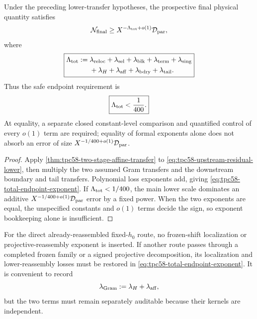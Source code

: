 \begin{proposition}
\label{prop:tpc58-endpoint-propagation}
Under the preceding lower-transfer hypotheses, the prospective final
physical quantity satisfies
\begin{equation}
 \mathcal N_{\rm final}
 \ge X^{-\Lambda_{\rm tot}+o(1)}\mathcal D_{\rm par},
 \label{eq:tpc58-prospective-final-lower}
\end{equation}
where
\begin{equation}
 \boxed{
 \begin{aligned}
 \Lambda_{\rm tot}
 :={}&\lambda_{\rm reloc}+\lambda_{\rm sel}+\lambda_{\rm blk}
 +\lambda_{\rm term}+\lambda_{\rm sing}\\
 &+\lambda_H+\lambda_{\rm aff}
 +\lambda_{\rm bdry}+\lambda_{\rm tail}.
 \end{aligned}}
 \label{eq:tpc58-total-endpoint-exponent}
\end{equation}
Thus the safe endpoint requirement is
\begin{equation}
 \boxed{\Lambda_{\rm tot}<\frac1{400}.}
 \label{eq:tpc58-strict-endpoint-budget}
\end{equation}
At equality, a separate closed constant-level comparison and quantified
control of every \(o(1)\) term are required; equality of formal exponents
alone does not absorb an error of size
\(X^{-1/400+o(1)}\mathcal D_{\rm par}\).
\end{proposition}

\begin{proof}
Apply \cref{thm:tpc58-two-stage-affine-transfer} to
\eqref{eq:tpc58-upstream-residual-lower}, then multiply the two assumed
Gram transfers and the downstream boundary and tail transfers.  Polynomial
loss exponents add, giving \eqref{eq:tpc58-total-endpoint-exponent}.  If
\(\Lambda_{\rm tot}<1/400\), the main lower scale dominates an additive
\(X^{-1/400+o(1)}\mathcal D_{\rm par}\) error by a fixed power.  When the two
exponents are equal, the unspecified constants and \(o(1)\) terms decide
the sign, so exponent bookkeeping alone is insufficient.
\end{proof}

For the direct already-reassembled fixed-\(h_0\) route, no frozen-shift
localization or projective-reassembly exponent is inserted.  If another
route passes through a completed frozen family or a signed projective
decomposition, its localization and lower-reassembly losses must be restored
in \eqref{eq:tpc58-total-endpoint-exponent}.  It is convenient to record
\begin{equation}
 \lambda_{\rm Gram}:=\lambda_H+\lambda_{\rm aff},
 \label{eq:tpc58-Gram-loss-split}
\end{equation}
but the two terms must remain separately auditable because their kernels are
independent.

